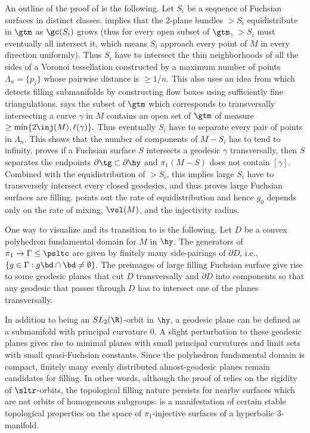 An outline of the proof of  is the following. Let $S_i$ be a sequence of Fuchsian surfaces in distinct \cbility classes. \cite{msErgodicInvariantMeasure} implies that the $2$-plane bundles $\gt S_i$  equidistribute in $\gtm$ as $\gc(S_i)$ grows (thus for every open subset of $\gtm$, $\gt S_i$ must eventually all intersect it, which means $S_i$ approach every point of $M$ in every direction uniformly). Thus $S_i$ have to intersect the thin neighborhoods of all the sides of a Voronoi tessellation constructed by a maximum number of points $\Lambda_n=\{p_j\}$ whose pairwise distance is $\geq 1/n$. This also uses an idea from \cite{dsCountingGeodesics} which detects filling submanifolds by constructing flow boxes using sufficiently fine triangulations.  says the subset of $\gtm$ which corresponds to transversally intersecting a curve $\gamma$ in $M$ contains an open set of $\gtm$ of measure $\geq \min\{2\inj(M), \ell(\gamma)\}.$ Thus eventually $S_i$ have to separate every pair of points in $\Lambda_n$. This shows that the number of components of $M-S_i$ has to tend to infinity.  proves if a Fuchsian surface $S$ intersects a geodesic $\gamma$ transversally, then $S$ separates the endpoints $\partial \tg \subset \partial \hy$ and $\pi_1(M-S)$ does not contain $[\gamma]$. Combined with the equidistribution of $\gt S_i$, this implies large $S_i$ have to transversely intersect every closed geodesics, and thus proves large Fuchsian surfaces are filling. \cite{lmPolynomialEffectiveDensity} points out the rate of equidistribution and hence $g_0$ depends only on the rate of mixing, $\vol(M)$, and the injectivity radius. 

 One way to visualize  and its transition to  is the following. Let $D$ be a convex polyhedron fundamental domain for $M$ in $\hy$. The generators of $\pi_1 \rightarrow \Gamma \leq \psltc$ are given by finitely many side-pairings of $\partial D$, i.e., $\{ g\in \Gamma: g\bd \cap \bd \neq \emptyset\} $. 
  The preimages of large filling Fuchsian surface give rise to some geodesic planes that cut $D$ transversally  and $\partial D$ into components so that any geodesic that passes through $D$ has to intersect one of the planes transversally. 

In addition to being an $SL_2(\R)$-orbit in $\hy$, a geodesic plane can be defined as a submanifold with principal curvature $0$. A slight perturbation to these geodesic planes gives rise to minimal planes with small principal curvatures and limit sets with small quasi-Fuchsian constants. Since the polyhedron fundamental domain is compact, finitely many evenly distributed almost-geodesic planes remain candidates for filling. In other words, although the proof of  relies on the rigidity of $\sltr$-orbits, the topological filling nature persists for nearby surfaces which are not orbits of homogeneous subgroups.  is a manifestation of certain stable topological properties on the space of $\pi_1$-injective surfaces of a hyperbolic $3$-manifold. 

